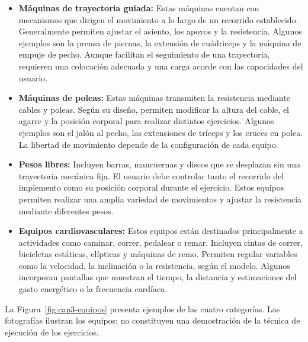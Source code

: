 \begin{itemize}
    \item \textbf{Máquinas de trayectoria guiada:}
    Estas máquinas cuentan con mecanismos que dirigen el movimiento a lo largo
    de un recorrido establecido. Generalmente permiten ajustar el asiento, los
    apoyos y la resistencia. Algunos ejemplos son la prensa de piernas, la
    extensión de cuádriceps y la máquina de empuje de pecho. Aunque facilitan
    el seguimiento de una trayectoria, requieren una colocación adecuada y una
    carga acorde con las capacidades del usuario.

    \item \textbf{Máquinas de poleas:}
    Estas máquinas transmiten la resistencia mediante cables y poleas. Según su
    diseño, permiten modificar la altura del cable, el agarre y la posición
    corporal para realizar distintos ejercicios. Algunos ejemplos son el jalón
    al pecho, las extensiones de tríceps y los cruces en polea. La libertad de
    movimiento depende de la configuración de cada equipo.

    \item \textbf{Pesos libres:}
    Incluyen barras, mancuernas y discos que se desplazan sin una trayectoria
    mecánica fija. El usuario debe controlar tanto el recorrido del implemento
    como su posición corporal durante el ejercicio. Estos equipos permiten
    realizar una amplia variedad de movimientos y ajustar la resistencia
    mediante diferentes pesos.

    \item \textbf{Equipos cardiovasculares:}
    Estos equipos están destinados principalmente a actividades como caminar,
    correr, pedalear o remar. Incluyen cintas de correr, bicicletas estáticas,
    elípticas y máquinas de remo. Permiten regular variables como la velocidad,
    la inclinación o la resistencia, según el modelo. Algunos incorporan
    pantallas que muestran el tiempo, la distancia y estimaciones del gasto
    energético o la frecuencia cardíaca.
\end{itemize}


La Figura~\ref{fig:cap3-equipos} presenta ejemplos de las cuatro categorías.
Las fotografías ilustran los equipos; no constituyen una demostración de la
técnica de ejecución de los ejercicios.

